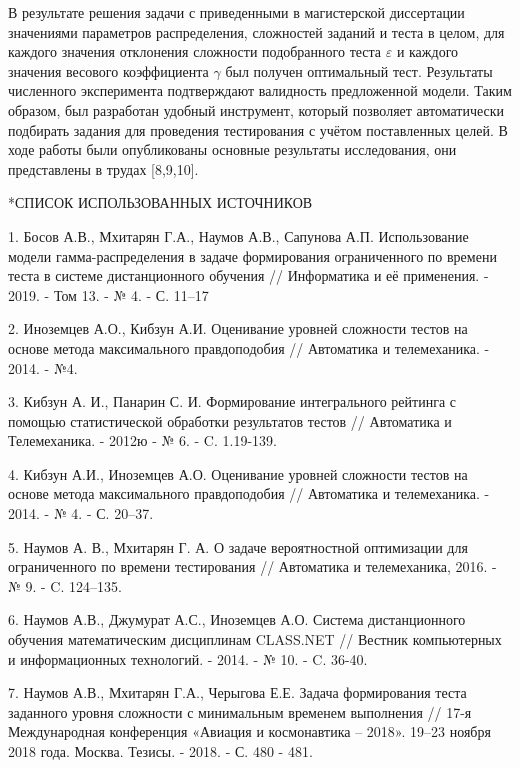 \documentclass[14pt, a4paper]{extarticle}
\makeatletter
\numberwithin{equation}{section}
\renewcommand{\section}{\@startsection{section}{1}{1.25cm}{-3.5ex plus -1ex minus -.2ex}{2.3ex plus.2ex}{\center\normalfont}}
\makeatother
\begin{document}
В результате решения задачи с приведенными в магистерской диссертации значениями параметров распределения, сложностей заданий и теста в целом, для каждого значения отклонения сложности подобранного теста $\varepsilon$ и каждого значения весового коэффициента $\gamma$ был получен оптимальный тест. Результаты численного эксперимента подтверждают валидность предложенной модели. Таким образом, был разработан удобный инструмент, который позволяет автоматически подбирать задания для проведения тестирования с учётом поставленных целей. В ходе работы были опубликованы основные результаты исследования, они представлены в трудах [8,9,10].

\newpage
\begin{center}
\section*{СПИСОК ИСПОЛЬЗОВАННЫХ ИСТОЧНИКОВ}
\end{center}

1.	Босов А.В., Мхитарян Г.А., Наумов А.В., Сапунова А.П. Использование модели гамма-распределения в задаче формирования ограниченного по времени теста в системе дистанционного обучения // Информатика и её применения. - 2019. - Том 13. - № 4. - С. 11–17

2.	Иноземцев А.О., Кибзун А.И. Оценивание уровней сложности тестов на основе метода максимального правдоподобия // Автоматика и телемеханика. - 2014. - №4.

3.	Кибзун А. И., Панарин С. И. Формирование интегрального рейтинга с помощью статистической обработки результатов тестов // Автоматика и Телемеханика. - 2012ю - № 6. - C. 1.19-139.

4.	Кибзун А.И., Иноземцев А.О. Оценивание уровней сложности тестов на основе метода максимального правдоподобия // Автоматика и телемеханика. - 2014. - № 4. - С. 20–37.

5.	Наумов А. В., Мхитарян Г. А. О задаче вероятностной оптимизации для ограниченного по времени тестирования // Автоматика и телемеханика, 2016. - № 9. - C. 124–135.

6.	Наумов А.В., Джумурат А.С., Иноземцев А.О. Система дистанционного обучения математическим дисциплинам CLASS.NET // Вестник компьютерных и информационных технологий. - 2014. - № 10. - C. 36-40.

7.	Наумов А.В., Мхитарян Г.А., Черыгова Е.Е. Задача формирования теста заданного уровня сложности с минимальным временем выполнения // 17-я Международная конференция «Авиация и космонавтика – 2018». 19–23 ноября 2018 года. Москва. Тезисы. - 2018. - С. 480 - 481.
\end{document}
